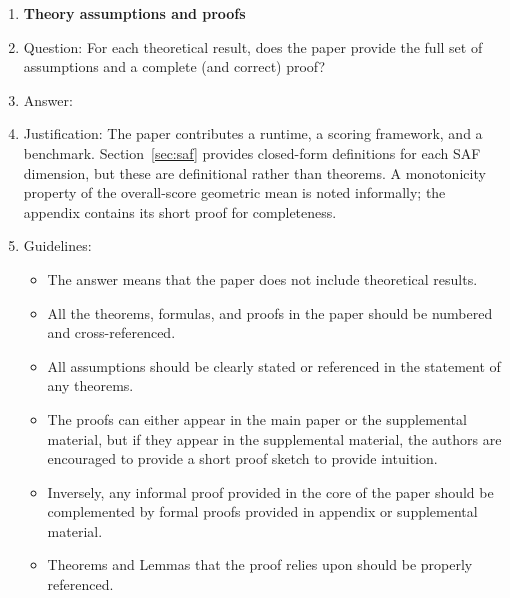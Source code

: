 \begin{enumerate}
\begin{itemize}
        \item The authors should discuss the computational efficiency of the proposed algorithms and how they scale with dataset size.
        \item If applicable, the authors should discuss possible limitations of their approach to address problems of privacy and fairness.
        \item While the authors might fear that complete honesty about limitations might be used by reviewers as grounds for rejection, a worse outcome might be that reviewers discover limitations that aren't acknowledged in the paper. The authors should use their best judgment and recognize that individual actions in favor of transparency play an important role in developing norms that preserve the integrity of the community. Reviewers will be specifically instructed to not penalize honesty concerning limitations.
    \end{itemize}

\item {\bf Theory assumptions and proofs}
    \item[] Question: For each theoretical result, does the paper provide the full set of assumptions and a complete (and correct) proof?
    \item[] Answer: \answerNA{}
    \item[] Justification: The paper contributes a runtime, a scoring framework, and a benchmark. Section~\ref{sec:saf} provides closed-form definitions for each SAF dimension, but these are definitional rather than theorems. A monotonicity property of the overall-score geometric mean is noted informally; the appendix contains its short proof for completeness.
    \item[] Guidelines:
    \begin{itemize}
        \item The answer \answerNA{} means that the paper does not include theoretical results.
        \item All the theorems, formulas, and proofs in the paper should be numbered and cross-referenced.
        \item All assumptions should be clearly stated or referenced in the statement of any theorems.
        \item The proofs can either appear in the main paper or the supplemental material, but if they appear in the supplemental material, the authors are encouraged to provide a short proof sketch to provide intuition.
        \item Inversely, any informal proof provided in the core of the paper should be complemented by formal proofs provided in appendix or supplemental material.
        \item Theorems and Lemmas that the proof relies upon should be properly referenced.
    \end{itemize}


\end{enumerate}
